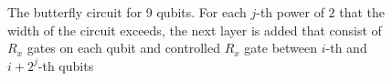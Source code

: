 \begin{figure}[htbp!] \ContinuedFloat
{}
\caption{The butterfly circuit for 9 qubits. For each $j$-th power of $2$ that the
    width of the circuit exceeds, the next layer is added that consist of $R_x$
    gates on each qubit and controlled $R_x$ gate between $i$-th and $i+2^j$-th qubits }
\end{figure}
